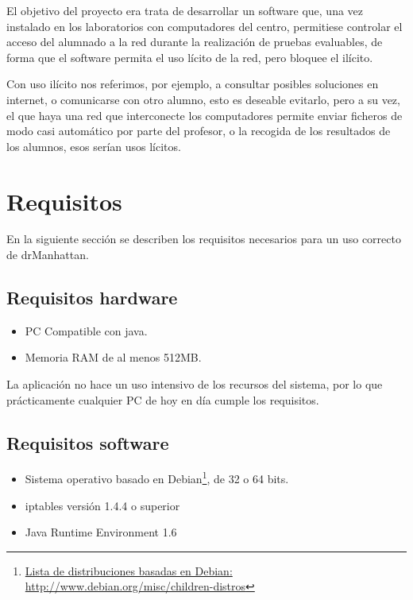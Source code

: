 \documentclass[11pt]{article}
\begin{document}
El objetivo del proyecto era trata de desarrollar un software que, una vez instalado en los laboratorios con computadores del centro, permitiese controlar el acceso del alumnado a la red durante la realización de pruebas evaluables, de forma que el software permita el uso lícito de la red, pero bloquee el ilícito.

Con uso ilícito nos referimos, por ejemplo, a consultar posibles soluciones en internet, o comunicarse con otro alumno, esto es deseable evitarlo, pero a su vez, el que haya una red que interconecte los computadores permite enviar ficheros de modo casi automático por parte del profesor, o la recogida de los resultados de los alumnos, esos serían usos lícitos.



\newpage

\section{Requisitos}

En la siguiente sección se describen los requisitos necesarios para un uso correcto de drManhattan.

\subsection{Requisitos hardware}

\begin{itemize}

    \item PC Compatible con java.

    \item Memoria RAM de al menos 512MB.

\end{itemize}

La aplicación no hace un uso intensivo de los recursos del sistema, por lo que prácticamente cualquier PC de hoy en día cumple los requisitos.


\subsection{Requisitos software}

\begin{itemize}

    \item Sistema operativo basado en Debian\footnote{\href{http://www.debian.org/misc/children-distros}{Lista de distribuciones basadas en Debian: http://www.debian.org/misc/children-distros}}, de 32 o 64 bits.

    \item iptables versión 1.4.4 o superior

    \item Java Runtime Environment 1.6

\end{itemize}
\end{document}
